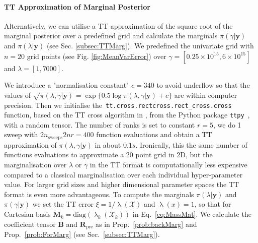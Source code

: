\paragraph{TT Approximation of Marginal Posterior}
Alternatively, we can utilise a TT approximation of the square root of the marginal posterior over a predefined grid and calculate the marginals $\pi(\gamma|\bm{y})$ and $\pi(\lambda|\bm{y})$ (see Sec. \ref{subsec:TTMarg}).
We predefined the univariate grid with $n = 20$ grid points (see Fig. \ref{fig:MeanVarError}) over $\gamma = [ 0.25 \times 10^{15}, 6 \times 10^{15}]$ and $\lambda = [ 1, 7000]$.

We introduce a "normalisation constant" $c = 340$ to avoid underflow so that the values of $\sqrt{\pi( \lambda,\gamma| \bm{y})} = \exp \{ 0.5 \log  \pi(\lambda,\gamma | \bm{y}) + c \} $ are within computer precision.
Then we initialise the~\texttt{tt.cross.rectcross.rect\_cross.cross} function, based on the TT cross algorithm in \cite{OSELEDETS2010TTCross,Dolgov2018TTCross}, from the Python package \texttt{ttpy}~\cite{Oseledets2018ttpy}, with a random tensor.
The number of ranks is set to constant $r = 5$, we do 1 sweep with $2n_{\text{sweeps}}2nr =400$ function evaluations and obtain a TT approximation of $\pi( \lambda,\gamma| \bm{y})$ in about $0.1s$.
Ironically, this the same number of functions evaluations to approximate a 20 point grid in 2D, but the marginalisation over $\lambda$ or $\gamma$ in the TT format is computationally less expensive compared to a classical marginalisation over each individual hyper-parameter value.
For larger grid sizes and higher dimensional parameter spaces the TT format is even more advantageous.
To compute the marginals $\pi(\lambda| \bm{y})$ and $\pi(\gamma| \bm{y})$ we set the TT error $\xi = 1 / \uplambda (\mathcal{X})$ and $\uplambda(x) = 1$, so that for Cartesian basis $\bm{M}_k = \text{diag}(\uplambda_k(\mathcal{X}_k))$ in Eq.~\ref{eq:MassMat}.
We calculate the coefficient tensor $\bm{B}$ and $\bm{R}_{\text{pre}}$ as in Prop.~\ref{prob:backMarg} and Prop.~\ref{prob:ForMarg} (see Sec.~\ref{subsec:TTMarg}).

